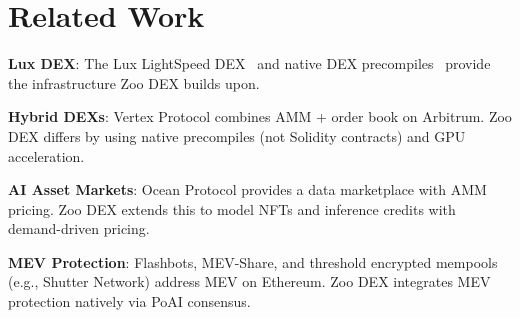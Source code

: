 \section{Related Work}


\textbf{Lux DEX}: The Lux LightSpeed DEX~\cite{lux-lightspeed-dex} and native DEX precompiles~\cite{lux-dex} provide the infrastructure Zoo DEX builds upon.

\textbf{Hybrid DEXs}: Vertex Protocol combines AMM + order book on Arbitrum. Zoo DEX differs by using native precompiles (not Solidity contracts) and GPU acceleration.

\textbf{AI Asset Markets}: Ocean Protocol provides a data marketplace with AMM pricing. Zoo DEX extends this to model NFTs and inference credits with demand-driven pricing.

\textbf{MEV Protection}: Flashbots, MEV-Share, and threshold encrypted mempools (e.g., Shutter Network) address MEV on Ethereum. Zoo DEX integrates MEV protection natively via PoAI consensus.

